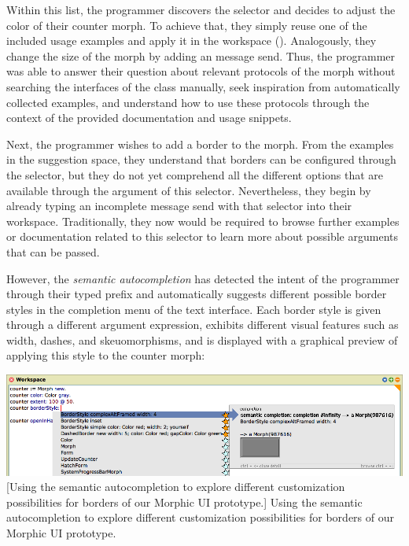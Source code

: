 Within this list, the programmer discovers the  selector and decides to adjust the color of their counter morph.
To achieve that, they simply reuse one of the included usage examples and apply it in the workspace ().
Analogously, they change the size of the morph by adding an  message send.
Thus, the programmer was able to answer their question about relevant protocols of the morph without searching the interfaces of the  class manually, seek inspiration from automatically collected examples, and understand how to use these protocols through the context of the provided documentation and usage snippets.

Next, the programmer wishes to add a border to the morph.
From the examples in the suggestion space, they understand that borders can be configured through the  selector, but they do not yet comprehend all the different options that are available through the argument of this selector.
Nevertheless, they begin by already typing an incomplete message send with that selector into their workspace.
Traditionally, they now would be required to browse further examples or documentation related to this selector to learn more about possible arguments that can be passed.

However, the \emph{semantic autocompletion} has detected the intent of the programmer through their typed prefix and automatically suggests different possible border styles in the completion menu of the text interface.
Each border style is given through a different argument expression, exhibits different visual features such as width, dashes, and skeuomorphisms, and is displayed with a graphical preview of applying this style to the counter morph:

\begin{center}
	\includegraphics[width=\linewidth]{01_suggestions/semantic_autocompletion.png} %
	[Using the semantic autocompletion to explore different customization possibilities for borders of our Morphic UI prototype.]{
		Using the semantic autocompletion to explore different customization possibilities for borders of our Morphic UI prototype.
	}
\end{center}

